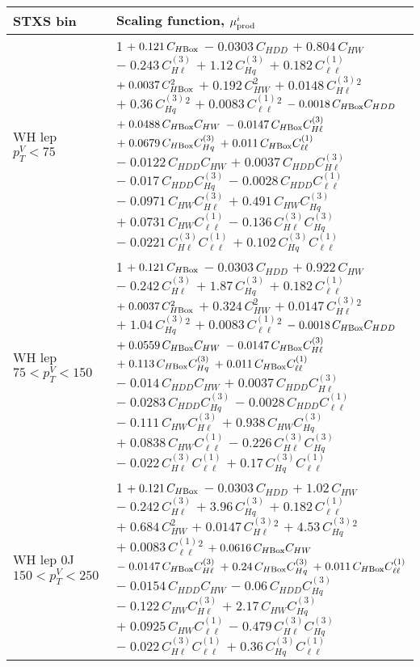 \begin{tabular}{l|p{}}
    STXS bin & Scaling function, $\mu^i_{\rm{prod}}$ \\ \hline
    WH lep $p_{T}^{V} < 75$ & 1 $+\;0.121\,C_{H\rm{Box}}$ $-\;0.0303\,C_{HDD}$ $+\;0.804\,C_{HW}$ $-\;0.243\,C^{(3)}_{H\ell}$ $+\;1.12\,C^{(3)}_{Hq}$ $+\;0.182\,C^{(1)}_{\ell\ell}$ $+\;0.0037\,C_{H\rm{Box}}^{2}$ $+\;0.192\,C_{HW}^{2}$ $+\;0.0148\,C^{(3)}_{H\ell}^{2}$ $+\;0.36\,C^{(3)}_{Hq}^{2}$ $+\;0.0083\,C^{(1)}_{\ell\ell}^{2}$ $-\;0.0018\,C_{H\rm{Box}}C_{HDD}$ $+\;0.0488\,C_{H\rm{Box}}C_{HW}$ $-\;0.0147\,C_{H\rm{Box}}C^{(3)}_{H\ell}$ $+\;0.0679\,C_{H\rm{Box}}C^{(3)}_{Hq}$ $+\;0.011\,C_{H\rm{Box}}C^{(1)}_{\ell\ell}$ $-\;0.0122\,C_{HDD}C_{HW}$ $+\;0.0037\,C_{HDD}C^{(3)}_{H\ell}$ $-\;0.017\,C_{HDD}C^{(3)}_{Hq}$ $-\;0.0028\,C_{HDD}C^{(1)}_{\ell\ell}$ $-\;0.0971\,C_{HW}C^{(3)}_{H\ell}$ $+\;0.491\,C_{HW}C^{(3)}_{Hq}$ $+\;0.0731\,C_{HW}C^{(1)}_{\ell\ell}$ $-\;0.136\,C^{(3)}_{H\ell}C^{(3)}_{Hq}$ $-\;0.0221\,C^{(3)}_{H\ell}C^{(1)}_{\ell\ell}$ $+\;0.102\,C^{(3)}_{Hq}C^{(1)}_{\ell\ell}$ \\
    WH lep $75 < p_{T}^{V} < 150$ & 1 $+\;0.121\,C_{H\rm{Box}}$ $-\;0.0303\,C_{HDD}$ $+\;0.922\,C_{HW}$ $-\;0.242\,C^{(3)}_{H\ell}$ $+\;1.87\,C^{(3)}_{Hq}$ $+\;0.182\,C^{(1)}_{\ell\ell}$ $+\;0.0037\,C_{H\rm{Box}}^{2}$ $+\;0.324\,C_{HW}^{2}$ $+\;0.0147\,C^{(3)}_{H\ell}^{2}$ $+\;1.04\,C^{(3)}_{Hq}^{2}$ $+\;0.0083\,C^{(1)}_{\ell\ell}^{2}$ $-\;0.0018\,C_{H\rm{Box}}C_{HDD}$ $+\;0.0559\,C_{H\rm{Box}}C_{HW}$ $-\;0.0147\,C_{H\rm{Box}}C^{(3)}_{H\ell}$ $+\;0.113\,C_{H\rm{Box}}C^{(3)}_{Hq}$ $+\;0.011\,C_{H\rm{Box}}C^{(1)}_{\ell\ell}$ $-\;0.014\,C_{HDD}C_{HW}$ $+\;0.0037\,C_{HDD}C^{(3)}_{H\ell}$ $-\;0.0283\,C_{HDD}C^{(3)}_{Hq}$ $-\;0.0028\,C_{HDD}C^{(1)}_{\ell\ell}$ $-\;0.111\,C_{HW}C^{(3)}_{H\ell}$ $+\;0.938\,C_{HW}C^{(3)}_{Hq}$ $+\;0.0838\,C_{HW}C^{(1)}_{\ell\ell}$ $-\;0.226\,C^{(3)}_{H\ell}C^{(3)}_{Hq}$ $-\;0.022\,C^{(3)}_{H\ell}C^{(1)}_{\ell\ell}$ $+\;0.17\,C^{(3)}_{Hq}C^{(1)}_{\ell\ell}$ \\
    WH lep 0J $150 < p_{T}^{V} < 250$ & 1 $+\;0.121\,C_{H\rm{Box}}$ $-\;0.0303\,C_{HDD}$ $+\;1.02\,C_{HW}$ $-\;0.242\,C^{(3)}_{H\ell}$ $+\;3.96\,C^{(3)}_{Hq}$ $+\;0.182\,C^{(1)}_{\ell\ell}$ $+\;0.684\,C_{HW}^{2}$ $+\;0.0147\,C^{(3)}_{H\ell}^{2}$ $+\;4.53\,C^{(3)}_{Hq}^{2}$ $+\;0.0083\,C^{(1)}_{\ell\ell}^{2}$ $+\;0.0616\,C_{H\rm{Box}}C_{HW}$ $-\;0.0147\,C_{H\rm{Box}}C^{(3)}_{H\ell}$ $+\;0.24\,C_{H\rm{Box}}C^{(3)}_{Hq}$ $+\;0.011\,C_{H\rm{Box}}C^{(1)}_{\ell\ell}$ $-\;0.0154\,C_{HDD}C_{HW}$ $-\;0.06\,C_{HDD}C^{(3)}_{Hq}$ $-\;0.122\,C_{HW}C^{(3)}_{H\ell}$ $+\;2.17\,C_{HW}C^{(3)}_{Hq}$ $+\;0.0925\,C_{HW}C^{(1)}_{\ell\ell}$ $-\;0.479\,C^{(3)}_{H\ell}C^{(3)}_{Hq}$ $-\;0.022\,C^{(3)}_{H\ell}C^{(1)}_{\ell\ell}$ $+\;0.36\,C^{(3)}_{Hq}C^{(1)}_{\ell\ell}$ \\

\end{tabular}
